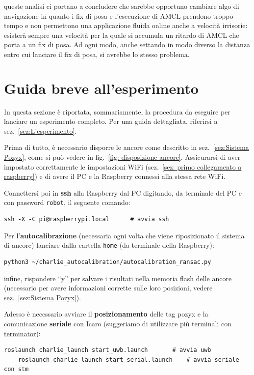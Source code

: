 queste analisi ci portano a concludere che sarebbe opportuno cambiare algo di navigazione in quanto i fix di posa e l'esecuzione di AMCL prendono troppo tempo e non permettono una applicazione fluida online anche a velocità irrisorie: esisterà sempre una velocità per la quale si accumula un ritardo di AMCL che porta a un fix di posa. Ad ogni modo, anche settando in modo diverso la distanza entro cui lanciare il fix di posa, si avrebbe lo stesso problema.

\newpage
\section{Guida breve all'esperimento}
\label{sez: Guida breve all'esperimento}
In questa sezione è riportata, sommariamente, la procedura da eseguire per lanciare un esperimento completo. Per una guida dettagliata, riferirsi a 
sez.~\ref{sez:L'esperimento}. 

Prima di tutto, è necessario disporre le ancore come descritto in sez.~\ref{sez:Sistema Pozyx}, come si può vedere in fig.~\ref{fig: disposizione ancore}. 
Assicurarsi di aver impostato correttamente le impostazioni WiFi (sez.~\ref{sez: primo collegamento a raspberry}) e di avere il PC e la Raspberry connessi 
alla stessa rete WiFi.


Connettersi poi in \textbf{ssh} alla Raspberry dal PC digitando, da terminale del PC e con password \texttt{robot}, il seguente comando:
\begin{lstlisting}[style=bashPC]
	ssh -X -C pi@raspberrypi.local		# avvia ssh
\end{lstlisting}

Per l'\textbf{autocalibrazione} (necessaria ogni volta che viene riposizionato il sistema di ancore) lanciare 
dalla cartella \texttt{home} (da terminale della Raspberry):
\begin{lstlisting}[style=bash]
	python3 ~/charlie_autocalibration/autocalibration_ransac.py
\end{lstlisting}
infine, rispondere ``y'' per salvare i risultati nella memoria flash delle ancore (necessario per avere informazioni corrette sulle loro posizioni, vedere 
sez.~\ref{sez:Sistema Pozyx}).

Adesso è necessario avviare il \textbf{posizionamento} delle tag pozyx e la comunicazione \textbf{seriale} con Icaro (suggeriamo di utilizzare più terminali 
con \href{https://terminator-gtk3.readthedocs.io/en/latest/}{terminator}):
\begin{lstlisting}[style=bash]
	roslaunch charlie_launch start_uwb.launch		# avvia uwb
	roslaunch charlie_launch start_serial.launch	# avvia seriale con stm
\end{lstlisting}

